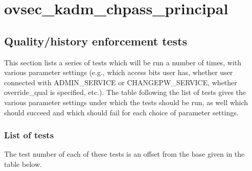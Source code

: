 









\section{ovsec_kadm_chpass_principal}
\label{ovseckadmchpassprincipal}

\subsection{Quality/history enforcement tests}

This section lists a series of tests which will be run a number of
times, with various parameter settings (e.g., which access bits user
has, whether user connected with ADMIN_SERVICE or CHANGEPW_SERVICE,
whether override_qual is specified, etc.).  The table following the
list of tests gives the various parameter settings under which the
tests should be run, as well which should succeed and which should
fail for each choice of parameter settings.

\subsubsection{List of tests}

The test number of each of these tests is an offset from the base
given in the table below.



